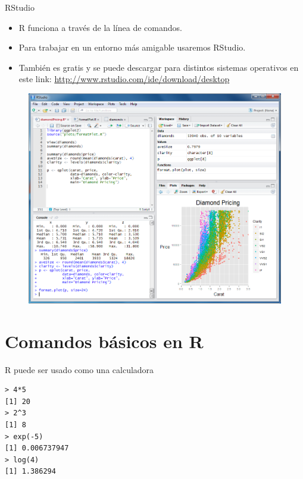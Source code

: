 \documentclass[handout]{beamer}
\begin{document}
\begin{frame}{RStudio}
\scriptsize{
\begin{itemize}
 \item R funciona a través de la línea de comandos.
 \item Para trabajar en un entorno más amigable usaremos RStudio.
 \item También es gratis y se puede descargar para distintos sistemas operativos en este link: \url{http://www.rstudio.com/ide/download/desktop}
\end{itemize}

} 

\begin{figure}[h!]
	\centering
	\includegraphics[scale=0.2]{imagenes/rstudio.png}
\end{figure}

 
\end{frame}


\section{Comandos básicos en R}

\begin{frame}[fragile]{R puede ser usado como una calculadora}
\begin{verbatim}
> 4*5
[1] 20
> 2^3
[1] 8
> exp(-5)
[1] 0.006737947
> log(4)
[1] 1.386294
\end{verbatim}


 
\end{frame}
\end{document}
